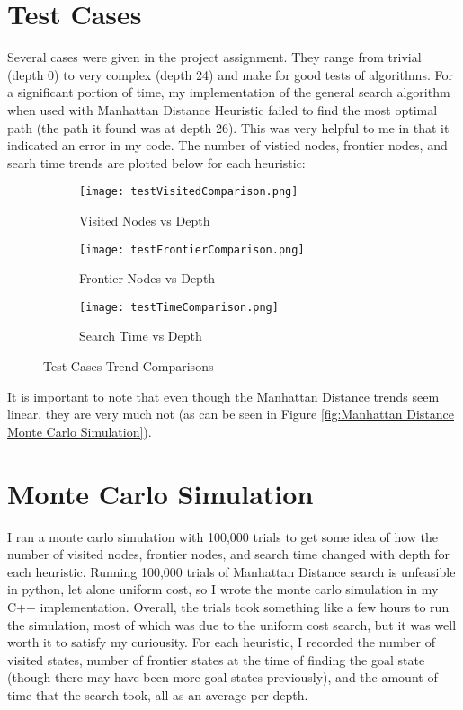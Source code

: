 \documentclass{article}
\begin{document}
\section{Test Cases}
Several cases were given in the project assignment. They range from trivial (depth 0) to very complex (depth 24) and make for good tests of algorithms. For a significant portion of time, my implementation of the general search algorithm when used with Manhattan Distance Heuristic failed to find the most optimal path (the path it found was at depth 26). This was very helpful to me in that it indicated an error in my code. The number of vistied nodes, frontier nodes, and searh time trends are plotted below for each heuristic:
\begin{figure}[ht]
	\centering
	\begin{subfigure}[b]{0.32\textwidth}
		\centering
		\texttt{[image: testVisitedComparison.png]}
		\caption{Visited Nodes vs Depth}
		\label{fig:Visited Nodes Comparison}
	\end{subfigure}
	\hfill
	\begin{subfigure}[b]{0.32\textwidth}
		\centering
		\texttt{[image: testFrontierComparison.png]}
		\caption{Frontier Nodes vs Depth}
		\label{fig:Frontier Nodes Comparison}
	\end{subfigure}
	\hfill
	\begin{subfigure}[b]{0.32\textwidth}
		\centering
		\texttt{[image: testTimeComparison.png]}
		\caption{Search Time vs Depth}
		\label{fig:Search Time Comparison}
	\end{subfigure}
	\caption{Test Cases Trend Comparisons}
	\label{fig:Test Cases Trend Comparisons}
\end{figure}
\par It is important to note that even though the Manhattan Distance trends seem linear, they are very much not (as can be seen in Figure \ref{fig:Manhattan Distance Monte Carlo Simulation}). 
\section{Monte Carlo Simulation}
I ran a monte carlo simulation with 100,000 trials to get some idea of how the number of visited nodes, frontier nodes, and search time changed with depth for each heuristic. Running 100,000 trials of Manhattan Distance search is unfeasible in python, let alone uniform cost, so I wrote the monte carlo simulation in my C++ implementation. Overall, the trials took something like a few hours to run the simulation, most of which was due to the uniform cost search, but it was well worth it to satisfy my curiousity.  For each heuristic, I recorded the number of visited states, number of frontier states at the time of finding the goal state (though there may have been more goal states previously), and the amount of time that the search took, all as an average per depth.
\pagebreak
\end{document}
